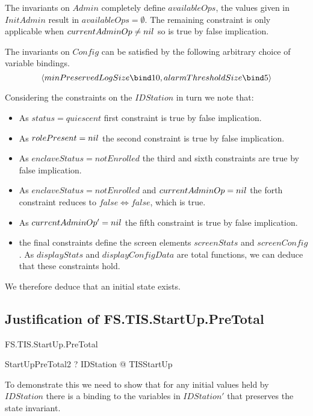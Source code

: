 The invariants on $Admin$ completely define $availableOps$, the values
given in $InitAdmin$ result in $availableOps = \emptyset$. The
remaining constraint is only applicable when $currentAdminOp \neq
nil$ so is true by false implication.

The invariants on $Config$ can be satisfied by the following arbitrary
choice of variable bindings. 
\[
\langle minPreservedLogSize \bind 10, alarmThresholdSize \bind 5 \rangle
\]

Considering the constraints on the $IDStation$ in turn we note that:
\begin{itemize}
\item
As $status = quiescent$ first constraint is true by false
implication.
\item
As $rolePresent = nil$ the second constraint is true by false
implication.
\item
As $enclaveStatus = notEnrolled$ the third and sixth constraints are true by false
implication.
\item
As $enclaveStatus = notEnrolled$ and $currentAdminOp = nil$ the forth
constraint reduces to $false \iff false$, which is true.
\item
As $currentAdminOp' = nil$ the fifth constraint is true by false implication.
\item
the final constraints define the screen elements $screenStats$ and
$screenConfig$. As $displayStats$ and $displayConfigData$ are total
functions, we can deduce that these constraints hold.
\end{itemize}

We therefore deduce that an initial state exists.

\subsection{Justification of FS.TIS.StartUp.PreTotal}

\begin{Zpobtrace}{FS.TIS.StartUp.PreTotal}
\begin{theorem}
StartUpPreTotal2 \vdash? \forall IDStation @ \pre TISStartUp
\end{theorem}
\end{Zpobtrace}

To demonstrate this we need to show that for any initial values held
by $IDStation$ there is a binding to the variables in $IDStation'$
that preserves the state invariant.

